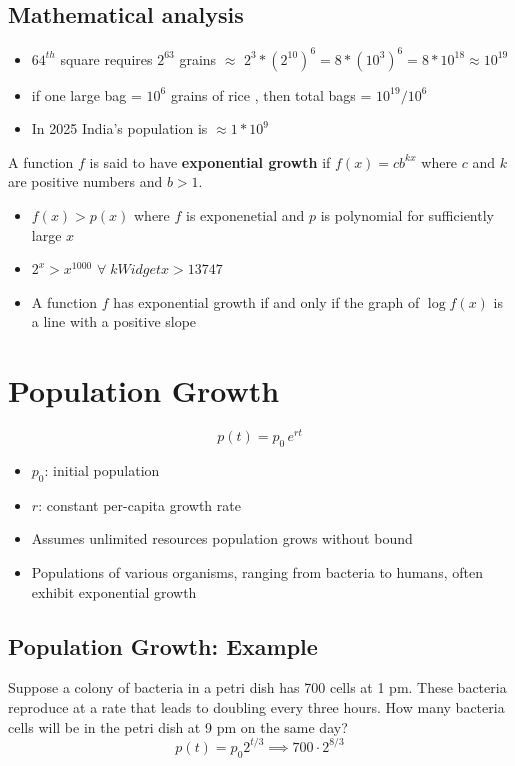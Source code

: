 \subsection{Mathematical analysis}
\begin{itemize}
  \item \(64^{th}\) square requires \( 2^{63} \) grains \(\approx\) \(2^{3}* (2^{10})^{6} = 8*(10^{3})^{6} = 8*10^{18} \approx 10^{19} \)
  \item if one large bag = \(10^{6} \) grains of rice , then total bags = \(10^{19}/10^{6} \)
  \item In 2025 India's population is \(\approx 1 * 10^{9} \)
\end{itemize}

A function \(f\) is said to have \textbf{exponential growth} if \(f(x) = cb^{kx} \) where
\(c\) and \(k\) are positive numbers and \(b > 1\).
\begin{itemize}
  \item \(f(x) > p(x)\)  where \(f\) is exponenetial and \(p\) is polynomial for sufficiently large \(x\)
  \item \(2^{x} > x^{1000} \)  \(\forall \;	kWidget x > 13747 \)
  \item A function \(f\) has exponential growth if and only if the graph of \(\log f(x)\) is a line with a positive slope
\end{itemize}

\section{Population Growth}
\[ p(t) = p_0\,e^{rt} \]
\begin{itemize}
  \item \(p_0\): initial population
  \item \(r\): constant per-capita growth rate
  \item Assumes unlimited resources \rightarrow population grows without bound
  \item Populations of various organisms, ranging from bacteria to humans, often exhibit exponential growth
\end{itemize}

\subsection{Population Growth: Example}
Suppose a colony of bacteria in a petri dish has 700 cells at 1 pm. These bacteria reproduce at a rate that leads to doubling every three hours. How many bacteria cells will be in the petri dish at 9 pm on the same day?
\[ p(t) = p_{0}2^{t/3} \implies 700 \cdot 2^{8/3} \]

